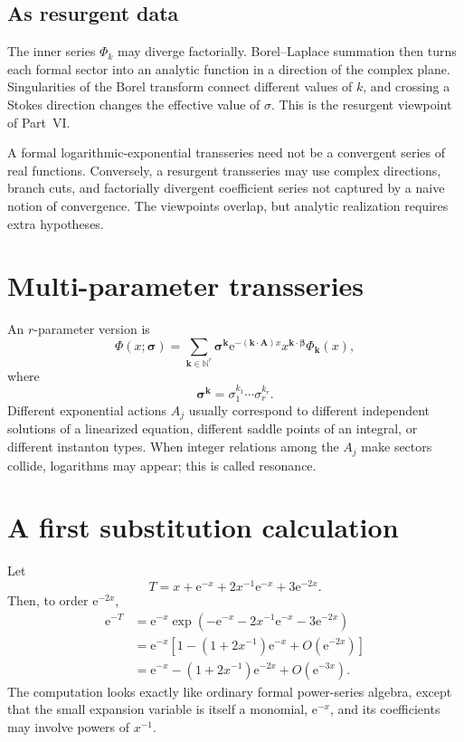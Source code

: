 \documentclass[11pt,oneside]{book}
\theoremstyle{definition}
\theoremstyle{remark}
\newcommand{\N}{\mathbb{N}}
\newcommand{\e}{\mathrm{e}}
\newcommand{\bigO}{O}
\newcommand{\sector}[1]{\Phi_{#1}}
\begin{document}
\subsection{As resurgent data}

The inner series $\sector{k}$ may diverge factorially. Borel--Laplace summation
then turns each formal sector into an analytic function in a direction of the
complex plane. Singularities of the Borel transform connect different values of
$k$, and crossing a Stokes direction changes the effective value of $\sigma$.
This is the resurgent viewpoint of Part~VI.

\begin{warningbox}[title=Do not silently identify the viewpoints]
A formal logarithmic-exponential transseries need not be a convergent series of
real functions. Conversely, a resurgent transseries may use complex directions,
branch cuts, and factorially divergent coefficient series not captured by a
naive notion of convergence. The viewpoints overlap, but analytic realization
requires extra hypotheses.
\end{warningbox}

\section{Multi-parameter transseries}

An $r$-parameter version is
\[
 \Phi(x;\bm\sigma)
 =\sum_{\bm k\in\N^r}
   \bm\sigma^{\bm k}
   \e^{-(\bm k\cdot\bm A)x}
   x^{\bm k\cdot\bm\beta}
   \Phi_{\bm k}(x),
\]
where
\[
  \bm\sigma^{\bm k}=\sigma_1^{k_1}\cdots\sigma_r^{k_r}.
\]
Different exponential actions $A_j$ usually correspond to different
independent solutions of a linearized equation, different saddle points of an
integral, or different instanton types. When integer relations among the $A_j$
make sectors collide, logarithms may appear; this is called resonance.

\section{A first substitution calculation}

Let
\[
  T=x+\e^{-x}+2x^{-1}\e^{-x}+3\e^{-2x}.
\]
Then, to order $\e^{-2x}$,
\begin{align*}
  \e^{-T}
  &=\e^{-x}\exp\left(-\e^{-x}-2x^{-1}\e^{-x}-3\e^{-2x}\right)\\
  &=\e^{-x}\left[
      1-(1+2x^{-1})\e^{-x}+\bigO(\e^{-2x})
    \right]\\
  &=\e^{-x}-(1+2x^{-1})\e^{-2x}+\bigO(\e^{-3x}).
\end{align*}
The computation looks exactly like ordinary formal power-series algebra, except
that the small expansion variable is itself a monomial, $\e^{-x}$, and its
coefficients may involve powers of $x^{-1}$.
\end{document}
